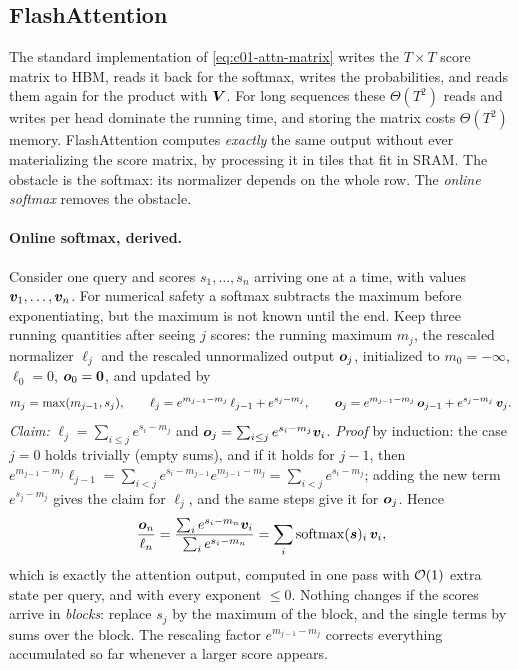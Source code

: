 \subsection{FlashAttention}\label{sec:c01-flash}

The standard implementation of \eqref{eq:c01-attn-matrix} writes the $T\times T$ score
matrix to HBM, reads it back for the softmax, writes the probabilities, and reads them again
for the product with $\bm{V}$. For long sequences these $\Theta(T^2)$ reads and writes per head
dominate the running time, and storing the matrix costs $\Theta(T^2)$ memory.
FlashAttention \citep{c01-dao2022flashattention,c01-dao2024flashattention2} computes
\emph{exactly} the same output without ever materializing the score matrix, by processing it
in tiles that fit in SRAM. The obstacle is the softmax: its normalizer depends on the whole
row. The \emph{online softmax} \citep{c01-milakov2018online,c01-rabe2021selfattention} removes
the obstacle.

\paragraph{Online softmax, derived.} Consider one query and scores $s_1, \dots, s_n$ arriving
one at a time, with values $\bm{v}_1, \dots, \bm{v}_n$. For numerical safety a softmax subtracts the
maximum before exponentiating, but the maximum is not known until the end. Keep three running
quantities after seeing $j$ scores: the running maximum $m_j$, the rescaled normalizer
$\ell_j$ and the rescaled unnormalized output $\bm{o}_j$, initialized to $m_0 = -\infty$,
$\ell_0 = 0$, $\bm{o}_0 = \bm{0}$, and updated by
\begin{equation}\label{eq:c01-online-softmax}
  m_j = \max(m_{j-1}, s_j),\qquad
  \ell_j = e^{m_{j-1} - m_j}\,\ell_{j-1} + e^{s_j - m_j},\qquad
  \bm{o}_j = e^{m_{j-1} - m_j}\,\bm{o}_{j-1} + e^{s_j - m_j}\,\bm{v}_j .
\end{equation}
\emph{Claim:} $\ell_j = \sum_{i\le j} e^{s_i - m_j}$ and $\bm{o}_j = \sum_{i\le j} e^{s_i -
m_j}\bm{v}_i$. \emph{Proof} by induction: the case $j = 0$ holds trivially (empty sums), and if it
holds for $j-1$, then
$e^{m_{j-1}-m_j}\ell_{j-1} = \sum_{i<j}e^{s_i - m_{j-1}}e^{m_{j-1} - m_j} = \sum_{i<j}e^{s_i -
m_j}$; adding the new term $e^{s_j - m_j}$ gives the claim for $\ell_j$, and the same steps
give it for $\bm{o}_j$. Hence
\[
  \frac{\bm{o}_n}{\ell_n} = \frac{\sum_i e^{s_i - m_n}\bm{v}_i}{\sum_i e^{s_i - m_n}}
  = \sum_i \operatorname{softmax}(\bm{s})_i\,\bm{v}_i ,
\]
which is exactly the attention output, computed in one pass with $\mathcal{O}(1)$ extra state per
query, and with every exponent $\le 0$. Nothing changes if the scores arrive in
\emph{blocks}: replace $s_j$ by the maximum of the block, and the single terms by sums over the
block. The rescaling factor $e^{m_{j-1} - m_j}$ corrects everything accumulated so far
whenever a larger score appears.

